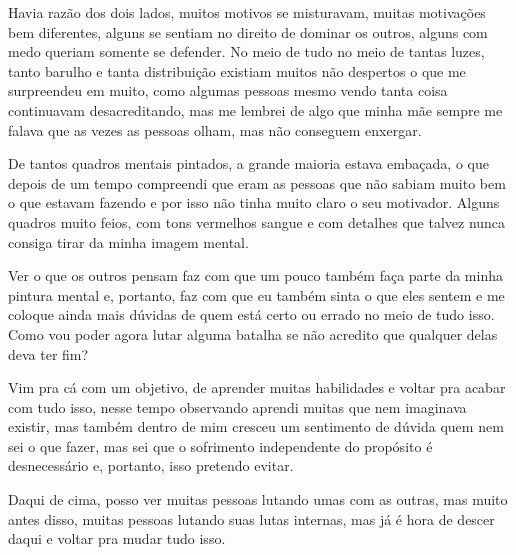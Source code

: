 Havia razão dos dois lados, muitos motivos se misturavam, muitas motivações bem diferentes, alguns se sentiam no direito de dominar os outros, alguns com medo queriam somente se defender. No meio de tudo no meio de tantas luzes, tanto barulho e tanta distribuição existiam muitos não despertos o que me surpreendeu em muito, como algumas pessoas mesmo vendo tanta coisa continuavam desacreditando, mas me lembrei de algo que minha mãe sempre me falava que as vezes as pessoas olham, mas não conseguem enxergar.

De tantos quadros mentais pintados, a grande maioria estava embaçada, o que depois de um tempo compreendi que eram as pessoas que não sabiam muito bem o que estavam fazendo e por isso não tinha muito claro o seu motivador. Alguns quadros muito feios, com tons vermelhos sangue e com detalhes que talvez nunca consiga tirar da minha imagem mental.

Ver o que os outros pensam faz com que um pouco também faça parte da minha pintura mental e, portanto, faz com que eu também sinta o que eles sentem e me coloque ainda mais dúvidas de quem está certo ou errado no meio de tudo isso. Como vou poder agora lutar alguma batalha se não acredito que qualquer delas deva ter fim?

Vim pra cá com um objetivo, de aprender muitas habilidades e voltar pra acabar com tudo isso, nesse tempo observando aprendi muitas que nem imaginava existir, mas também dentro de mim cresceu um sentimento de dúvida quem nem sei o que fazer, mas sei que o sofrimento independente do propósito é desnecessário e, portanto, isso pretendo evitar.

Daqui de cima, posso ver muitas pessoas lutando umas com as outras, mas muito antes disso, muitas pessoas lutando suas lutas internas, mas já é hora de descer daqui e voltar pra mudar tudo isso.


